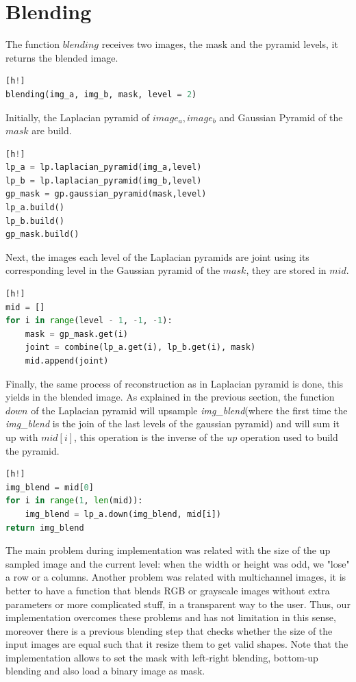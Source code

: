 \section{Blending}

The function $blending$ receives two images, the mask and the pyramid levels, it returns the blended image.

\begin{lstlisting}[language=python][h!]
blending(img_a, img_b, mask, level = 2)
\end{lstlisting}

Initially, the Laplacian pyramid of $image_a, image_b$ and Gaussian Pyramid of the $mask$ are build.

\begin{lstlisting}[language=python][h!]
lp_a = lp.laplacian_pyramid(img_a,level)
lp_b = lp.laplacian_pyramid(img_b,level)
gp_mask = gp.gaussian_pyramid(mask,level)
lp_a.build()
lp_b.build()
gp_mask.build()
\end{lstlisting}

Next, the images each level of the Laplacian pyramids are joint using its corresponding level in the Gaussian pyramid of the $mask$, they are stored in $mid$.

\begin{lstlisting}[language=python][h!]
mid = []
for i in range(level - 1, -1, -1):
	mask = gp_mask.get(i)
    joint = combine(lp_a.get(i), lp_b.get(i), mask)
    mid.append(joint)
\end{lstlisting}

Finally, the same process of reconstruction as in Laplacian pyramid is done, this  yields in the blended image. As explained in the previous section, the function $down$ of the Laplacian pyramid will upsample \textit{img\_blend}(where the first time the \textit{img\_blend} is the join of the last levels of the gaussian pyramid) and will sum it up with $mid[i]$, this operation is the inverse of the $up$ operation used to build the pyramid.

\begin{lstlisting}[language=python][h!]
img_blend = mid[0]
for i in range(1, len(mid)):
	img_blend = lp_a.down(img_blend, mid[i])
return img_blend
\end{lstlisting}

The main problem during implementation was related with the size of the up sampled image and the current level: when the width or height was odd, we "lose" a row or a columns. Another problem was related with multichannel images, it is better to have a function that blends RGB or grayscale images without extra parameters or more complicated stuff, in a transparent way to the user. Thus, our implementation overcomes these problems and has not limitation in this sense, moreover there is a previous blending step that checks whether the size of the input images are equal such that it resize them to get valid shapes. Note that the implementation allows to set the mask with left-right blending, bottom-up blending and also load a binary image as mask.

